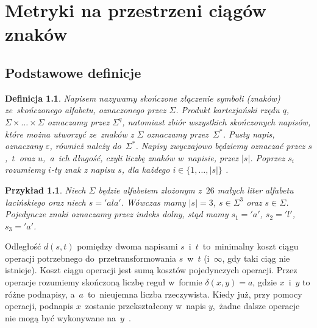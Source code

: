 \documentclass[12pt, twoside, openany]{report}
\theoremstyle{plain}
\newtheorem{defi}{Definicja}[section]
\newtheorem{prz}{Przykład}[section]
\begin{document}

%

\chapter{Metryki na przestrzeni ciągów
znaków}\label{metryki-na-przestrzeni-ciagow-znakow}

\section{Podstawowe definicje}

\begin{defi}
\emph{Napisem} nazywamy skończone złączenie symboli (znaków) ze~skończonego \emph{alfabetu}, oznaczonego przez $\Sigma$. Produkt kartezjański rzędu $q$, $\Sigma\times\ldots\times\Sigma$ oznaczamy przez $\Sigma^q$, natomiast zbiór wszystkich skończonych napisów, które można utworzyć ze~znaków z $\Sigma$ oznaczamy przez~$\Sigma^*$. \emph{Pusty napis}, oznaczany $\varepsilon$, również należy do~$\Sigma^*$. Napisy zwyczajowo będziemy oznaczać przez $s$,~$t$~oraz $u$,~a~ich \emph{długość}, czyli liczbę znaków w~napisie, przez $|s|$. Poprzez $s_i$ rozumiemy $i$-ty znak z napisu $s$, dla każdego $i \in \{1,\ldots,|s|\}$ \cite{Loo2014:stringdist}.
\end{defi}


\begin{prz}
Niech $\Sigma$ będzie alfabetem złożonym z~$26$ małych liter alfabetu łacińskiego oraz niech $s = 'ala'$. Wówczas mamy $|s| = 3$, $s \in \Sigma^3$ oraz $s \in \Sigma$. Pojedyncze znaki oznaczamy przez indeks dolny, stąd mamy $s_1 = 'a'$, $s_2 = 'l'$, $s_3 = 'a'$. %
\cite{Loo2014:stringdist}
\end{prz}

Odległość $d(s,t)$ pomiędzy dwoma napisami $s$~i~$t$~to~minimalny koszt ciągu operacji potrzebnego do~przetransformowania $s$~w~$t$ (i~$\infty$, gdy taki ciąg nie istnieje). Koszt ciągu operacji jest sumą kosztów pojedynczych operacji. Przez operacje rozumiemy skończoną liczbę reguł w~formie $\delta(x, y) = a$, gdzie $x$~i~$y$ to różne podnapisy, a~$a$~to~nieujemna liczba rzeczywista. Kiedy już, przy pomocy operacji, podnapis $x$~zostanie przekształcony w~napis $y$,~żadne dalsze operacje nie mogą być wykonywane na~$y$~\cite{Navarro2001:guidedtour}.
\end{document}
